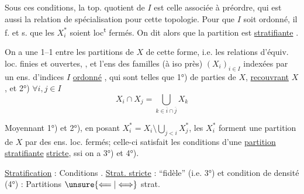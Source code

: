 Sous ces conditions, la top. quotient de $I$ est celle
associée à  préordre, qui est aussi
la relation de spécialisation pour cette topologie.
Pour que $I$ soit ordonné, il f. et s. que les
$X_i^*$ soient loc\textsuperscript{t} fermés. On dit alors que la partition est
\uline{stratifiante} .

On a une  1--1 entre les partitions
 de $X$ de cette forme, i.e. les relations d'équiv. loc.
finies et ouvertes, , et l'ens des familles (à iso près)
$(X_i)_{i\in I}$ indexées par un ens. d'indices $I$ \uline{ordonné}
,
qui sont telles que 1°)  \uline{} de parties
  de $X$,  \uline{recouvrant} $X$, et 2°) $\forall i,j\in I$
\[
X_i\cap X_j=\bigcup_{k\in\overline i\cap\overline j}X_k
\]


Moyennant 1°) et 2°), en posant $X_i^*=X_i\setminus\bigcup_{j<i}X_j^*$,
les $X_i^*$ forment une  partition  de $X$ par des
ens. loc. fermés; celle-ci satisfait les conditions
d'une \uline{partition} \uline{stratifiante} \uline{stricte},  ssi
on a 3°) et 4°).

\uline{Stratification} : Conditions . \uline{Strat. stricte} : ``fidèle'' (i.e.
3°) et condition de densité (4°) : Partitions  $\unsure{\Longleftarrow|\Longleftrightarrow}$ strat. 

